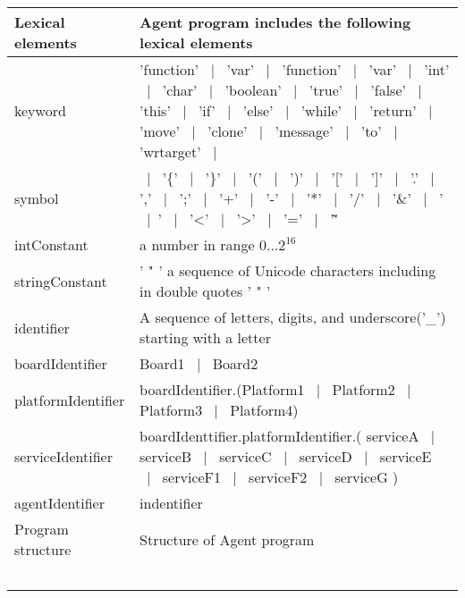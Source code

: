 \documentclass{scrreprt}
\begin{document}
\begin{longtable}{|l|p{5in}|}
\hline
Lexical elements  
&
Agent program includes the following lexical elements
\\
\hline
keyword
&
'function' $~\mid~$ 'var' $~\mid~$ 'function' $~\mid~$ 'var' $~\mid~$ 'int' $~\mid~$ 'char' $~\mid~$ 'boolean' $~\mid~$ 'true' $~\mid~$ 'false' $~\mid~$ 'this' $~\mid~$ 'if' $~\mid~$ 'else' $~\mid~$ 'while' $~\mid~$ 'return' $~\mid~$ 'move' $~\mid~$ 'clone' $~\mid~$  'message' $~\mid~$  'to'  $~\mid~$  'wrtarget'  $~\mid~$
\\
\hline
symbol
&
$~\mid~$  '\{'  $~\mid~$  '\}'  $~\mid~$  '('  $~\mid~$  ')'  $~\mid~$  '['  $~\mid~$  ']'  $~\mid~$  '.'  $~\mid~$  ','  $~\mid~$  ';'  $~\mid~$  '+'  $~\mid~$  '-'  $~\mid~$  '*'  $~\mid~$  '/'  $~\mid~$  '\&'  $~\mid~$  '$~\mid~$'  $~\mid~$  '<'  $~\mid~$  '>'  $~\mid~$  '='  $~\mid~$  '\~   '  
\\
\hline
intConstant
&
a number in range $0 \ldots 2^{16}$
\\
\hline
stringConstant
&
' " ' a sequence of Unicode characters including in double quotes ' " '
\\
\hline
identifier
&
A sequence of letters, digits, and underscore('_') starting with a letter
\\
\hline
boardIdentifier
&
Board1 $~\mid~$ Board2
\\
\hline
platformIdentifier
&
boardIdentifier.(Platform1 $~\mid~$ Platform2 $~\mid~$ Platform3 $~\mid~$ Platform4)
\\
\hline
serviceIdentifier
&
boardIdenttifier.platformIdentifier.( serviceA $~\mid~$ serviceB $~\mid~$ serviceC $~\mid~$ serviceD $~\mid~$ serviceE $~\mid~$ serviceF1 $~\mid~$  serviceF2 $~\mid~$ serviceG )
\\
\hline
agentIdentifier
&
indentifier
\\
\hline
Program structure
&
Structure of Agent program
\\
\hline

&

\\
\hline

&

\\
\hline

&

\\
\hline

&

\\
\hline

&


\end{longtable}
\end{document}
